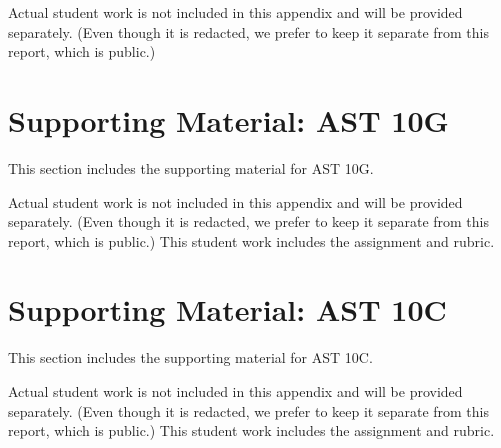 \documentclass[12pt]{article}
\begin{document}
Actual student work is not included in this appendix and will be
provided separately.  (Even though it is redacted, we prefer to keep
it separate from this report, which is public.)

\newpage


  


\section{Supporting Material: AST 10G}
\label{sec:supb}

This section includes the supporting material for AST 10G.

Actual student work is not included in this appendix and will be
provided separately.  (Even though it is redacted, we prefer to keep
it separate from this report, which is public.)  This student work
includes the assignment and rubric.

  

\newpage
\section{Supporting Material: AST 10C}
\label{sec:supc}

This section includes the supporting material for AST 10C.

Actual student work is not included in this appendix and will be
provided separately.  (Even though it is redacted, we prefer to keep
it separate from this report, which is public.)  This student work
includes the assignment and rubric.

\newpage

  
\end{document}
